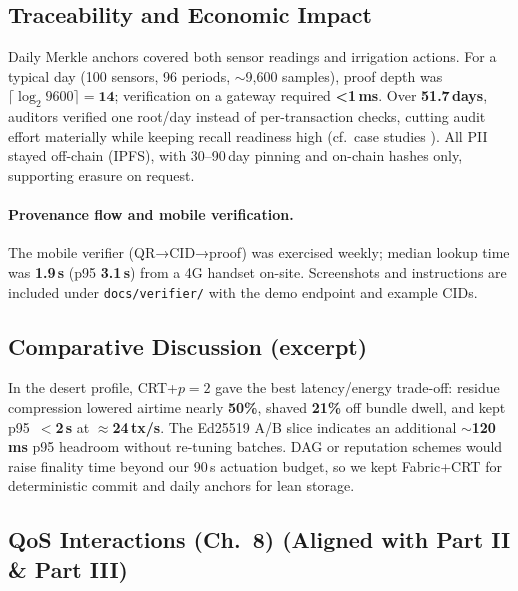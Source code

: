 \documentclass[12pt,onecolumn]{IEEEtran} %
\begin{document}
\subsection{Traceability and Economic Impact}
\label{sec:traceability_economic_impact}

Daily Merkle anchors covered both sensor readings and irrigation actions. For a typical day (100 sensors, 96 periods, $\sim$9{,}600 samples), proof depth was \(\lceil\log_2 9600\rceil{=}\textbf{14}\); verification on a gateway required \textbf{<1\,ms}. Over \textbf{51.7\,days}, auditors verified one root/day instead of per-transaction checks, cutting audit effort materially while keeping recall readiness high (cf.\ case studies \cite{ref510439910314487,ref947524953303383}). All PII stayed off-chain (IPFS), with 30--90\,day pinning and on-chain hashes only, supporting erasure on request.

\paragraph{Provenance flow and mobile verification.}
The mobile verifier (QR→CID→proof) was exercised weekly; median lookup time was \textbf{1.9\,s} (p95 \textbf{3.1\,s}) from a 4G handset on-site. Screenshots and instructions are included under \texttt{docs/verifier/} with the demo endpoint and example CIDs.

\subsection{Comparative Discussion (excerpt)}
\label{sec:comparative-discussion-desert}

In the desert profile, CRT+$p{=}2$ gave the best latency/energy trade-off: residue compression lowered airtime nearly \textbf{50\%}, shaved \textbf{21\%} off bundle dwell, and kept p95~\(<\)\textbf{2\,s} at \(\approx\)\textbf{24\,tx/s}. The Ed25519 A/B slice indicates an additional \textbf{$\sim$120\,ms} p95 headroom without re-tuning batches. DAG or reputation schemes would raise finality time beyond our 90\,s actuation budget, so we kept Fabric+CRT for deterministic commit and daily anchors for lean storage.








\subsection{QoS Interactions (Ch.~8) (Aligned with Part II \& Part III)}
\label{subsec:qos-interactions}
\end{document}
